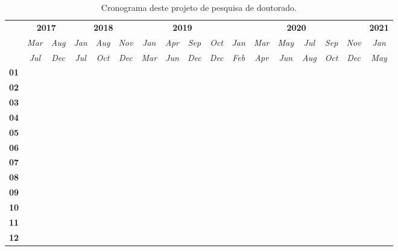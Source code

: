 \begin{table}[htb]
  \renewcommand{\arraystretch}{1.4}
  \caption{Cronograma deste projeto de pesquisa de doutorado.}
  \label{tab:timetable}
  \scriptsize
  \centering
  \begin{tabular}{c|cc|ccc|cccc|cccccc|c}
    \toprule
    & \multicolumn{2}{c|}{{\bf 2017}}
    & \multicolumn{3}{c|}{{\bf 2018}}
    & \multicolumn{4}{c|}{{\bf 2019}}
    & \multicolumn{6}{c|}{{\bf 2020}}
    & {\bf 2021} \\

    & {\it Mar} & {\it Aug} & {\it Jan} & {\it Aug} & {\it Nov} & {\it Jan} &
    {\it Apr} & {\it Sep} & {\it Oct} & {\it Jan} & {\it Mar} & {\it May} &
    {\it Jul} & {\it Sep} & {\it Nov} & {\it Jan} \\

    & {\it Jul} & {\it Dec} & {\it Jul} & {\it Oct} & {\it Dec} & {\it Mar} &
    {\it Jun} & {\it Dec} & {\it Dec} & {\it Feb} & {\it Apr} & {\it Jun} &
    {\it Aug} & {\it Oct} & {\it Dec} & {\it May} \\
    \hline %
    \arrayrulecolor{lightgray}

    {\bf 01} & \m & \m &    &    &    &    &    &    &    &    &    &    &    &    &    &    \\ \hline
    {\bf 02} &    & \m & \m & \m &    &    &    &    &    &    &    &    &    &    &    &    \\ \hline
    {\bf 03} &    &    & \m & \m & \m & \m &    &    &    &    &    &    &    &    &    &    \\ \hline
    {\bf 04} &    &    &    &    & \m & \m & \m &    &    &    &    &    &    &    &    &    \\ \hline
    {\bf 05} &    &    &    &    & \m & \m & \m & \m &    &    &    &    &    &    &    &    \\ \hline
    {\bf 06} &    &    &    &    &    &    &    & \m & \m &    &    &    &    &    &    &    \\ \hline
    {\bf 07} &    &    &    &    &    &    &    &    & \x & \x &    &    &    &    &    &    \\ \hline
    {\bf 08} &    &    &    &    &    &    &    &    & \x & \x & \x &    &    &    &    &    \\ \hline
    {\bf 09} &    &    &    &    &    &    &    &    &    & \x & \x & \x & \x & \x &    &    \\ \hline
    {\bf 10} &    &    &    &    &    &    &    &    &    &    &    & \x & \x & \x & \x &    \\ \hline
    {\bf 11} &    &    &    &    &    &    &    &    &    &    &    &    &    & \x & \x &    \\ \hline
    {\bf 12} &    &    &    &    &    &    &    &    &    &    &    &    &    & \x & \x & \x \\


\end{tabular}
\end{table}
